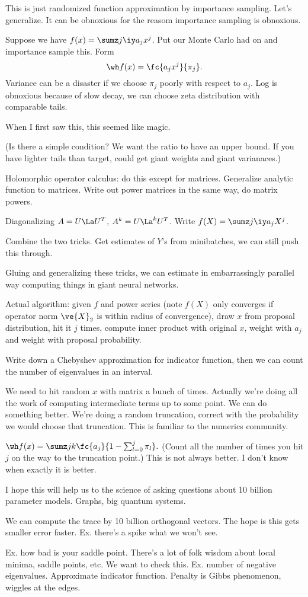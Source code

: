 This is just randomized function approximation by importance sampling. Let's generalize. It can be obnoxious for the reasom importance sampling is obnoxious.

Suppose we have $f(x) = \sumz j\iy a_jx^j$. Put our Monte Carlo had on and importance sample this. Form
$$
\wh f(x) = \fc{a_j x^j}{\pi_j}.
$$
Variance can be a disaster if we choose $\pi_j$ poorly with respect to $a_j$. Log is obnoxious because of slow decay, we can choose zeta distribution with comparable tails.

When I first saw this, this seemed like magic.

(Is there a simple condition? 
We want the ratio to have an upper bound. 
If you have lighter tails than target, could get giant weights and giant varianaces.) %

Holomorphic operator calculus: do this except for matrices. Generalize analytic function to matrices. Write out power matrices in the same way, do matrix powers.

Diagonalizing $A=U\La U^T$, $A^k = U\La^k U^T$. Write $f(X) =\sumz j\iy a_j X^j$. 

Combine the two tricks. Get estimates of $Y$'s from minibatches, we can still push this through.

Gluing and generalizing these tricks, we can estimate in embarrassingly parallel way computing things in giant neural networks. 

Actual algorithm: given $f$ and power series (note $f(X)$ only converges if operator norm $\ve{X}_2$ is within radius of convergence), draw $x$ from proposal distribution, hit it $j$ times, compute inner product with original $x$, weight with $a_j$ and weight with proposal probability.

Write down a Chebyshev approximation for indicator function, then we can count the number of eigenvalues in an interval.

We need to hit random $x$ with matrix a bunch of times. Actually we're doing all the work of computing intermediate terms up to some point. We can do something better. We're doing a random truncation, correct with the probability we would choose that truncation. This is familiar to the numerics community.

$\wh f(x) = \sumz jk \fc{a_j}{1-\sum_{l=0}^j \pi_l}.$
(Count all the number of times you hit $j$ on the way to the truncation point.)
This is not always better. I don't know when exactly it is better.

I hope this will help us to the science of asking questions about 10 billion parameter models. %
Graphs, big quantum systems. 

We can compute the trace by 10 billion orthogonal vectors. The hope is this gets smaller error faster. Ex. there's a spike what we won't see.

Ex. how bad is your saddle point. There's a lot of folk wisdom about local minima, saddle points, etc. We want to check this. Ex. number of negative eigenvalues. Approximate indicator function. Penalty is Gibbs phenomenon, wiggles at the edges.